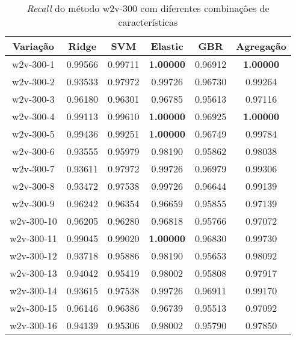 \begin{table}[H]
\label{tab:recallw2v300}
\centering
\begin{tabular}{|c| c c  c  c  c| }
\hline
Variação &  Ridge & SVM & Elastic & GBR & Agregação  \\ 
\hline
w2v-300-1 & 0.99566 & 0.99711 & \textbf{1.00000} & 0.96912 & \textbf{1.00000} \\
\hline
w2v-300-2 & 0.93533 & 0.97972 & 0.99726 & 0.96730 & 0.99264 \\
\hline
w2v-300-3 & 0.96180 & 0.96301 & 0.96785 & 0.95613 & 0.97116 \\
\hline
w2v-300-4 & 0.99113 & 0.99610 & \textbf{1.00000} & 0.96925 & \textbf{1.00000} \\
\hline
w2v-300-5 & 0.99436 & 0.99251 & \textbf{1.00000} & 0.96749 & 0.99784 \\
\hline
w2v-300-6 & 0.93555 & 0.95979 & 0.98190 & 0.95862 & 0.98038 \\
\hline
w2v-300-7 & 0.93611 & 0.97972 & 0.99726 & 0.96979 & 0.99306 \\
\hline
w2v-300-8 & 0.93472 & 0.97538 & 0.99726 & 0.96644 & 0.99139 \\
\hline
w2v-300-9 & 0.96242 & 0.96354 & 0.96659 & 0.95855 & 0.97139 \\
\hline
w2v-300-10 & 0.96205 & 0.96280 & 0.96818 & 0.95766 & 0.97072 \\
\hline
w2v-300-11 & 0.99045 & 0.99020 & \textbf{1.00000} & 0.96830 & 0.99730 \\
\hline
w2v-300-12 & 0.93718 & 0.95886 & 0.98190 & 0.95653 & 0.98092 \\
\hline
w2v-300-13 & 0.94042 & 0.95419 & 0.98002 & 0.95808 & 0.97917 \\
\hline
w2v-300-14 & 0.93615 & 0.97538 & 0.99726 & 0.96911 & 0.99170 \\
\hline
w2v-300-15 & 0.96146 & 0.96386 & 0.96739 & 0.95513 & 0.97092 \\
\hline
w2v-300-16 & 0.94139 & 0.95306 & 0.98002 & 0.95790 & 0.97850 \\
\hline
\end{tabular}
\caption{\textit{Recall} do método w2v-300 com diferentes combinações de características}
\end{table}

